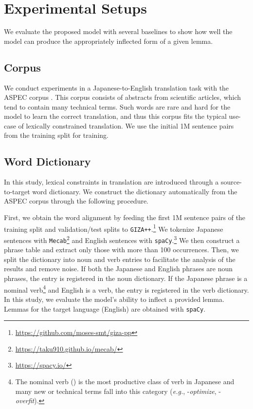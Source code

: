 \section{Experimental Setups}
We evaluate the proposed model with several baselines to show how well the model can produce the appropriately inflected form of a given lemma.

\subsection{Corpus}
We conduct experiments in a Japanese-to-English translation task with the ASPEC corpus \citep{nakazawa-etal-2016-aspec}.
This corpus consists of abstracts from scientific articles, which tend to contain many technical terms.
Such words are rare and hard for the model to learn the correct translation, and thus this corpus fits the typical use-case of lexically constrained translation.
We use the initial 1M sentence pairs from the training split for training.

\subsection{Word Dictionary}
In this study, lexical constraints in translation are introduced through a source-to-target word dictionary. We construct the dictionary automatically from the ASPEC corpus through the following procedure.

First, we obtain the word alignment by feeding the first 1M sentence pairs of the training split and validation/test splits to \texttt{GIZA++}.\footnote{\url{https://github.com/moses-smt/giza-pp}} We tokenize Japanese sentences with \texttt{Mecab}\footnote{\url{https://taku910.github.io/mecab/}} and English sentences with \texttt{spaCy}.\footnote{\url{https://spacy.io/}} We then construct a phrase table and extract only those with more than 100 occurrences.
Then, we split the dictionary into noun and verb entries to facilitate the analysis of the results and remove noise. If both the Japanese and English phrases are noun phrases, the entry is registered in the noun dictionary. If the Japanese phrase is a nominal verb\footnote{The nominal verb () is the most productive class of verb in Japanese and many new or technical terms fall into this category ({\it e.g.}, -{\it optimize}, -{\it overfit}).} and English is a verb, the entry is registered in the verb dictionary.
In this study, we evaluate the model's ability to inflect a provided lemma. Lemmas for the target language (English) are obtained with \texttt{spaCy}.

